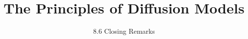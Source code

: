 
\title{The Principles of Diffusion Models}
\subtitle{8.6 Closing Remarks}


\begin{frame}
    \titlepage
\end{frame}


